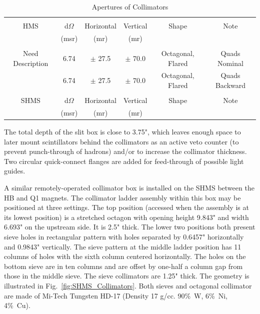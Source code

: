 {\begin{table}
\begin{center}
\caption{Apertures of Collimators\label{tab:apertures}}
\vspace{\baselineskip}
\begin{tabular}{|c|c|c|c|c|c|}
\hline
{} & {} & {} & {} & {} & {} \\
HMS				& d$\Omega$ 	& Horizontal 	& Vertical 		& Shape 			& Note \\
{} 				& (msr) 		& (mr) 		& (mr) 		& {} 				& {} \\
{} & {} & {} & {} & {} & {} \\ \hline
{}Need Description	& 6.74 		& $\pm$ 27.5 	& $\pm$ 70.0 	& Octagonal, Flared 	& Quads Nominal \\
{}	 			& 6.74 		& $\pm$ 27.5 	& $\pm$ 70.0 	& Octagonal, Flared 	& Quads Backward \\
{} & {} & {} & {} & {} & {} \\ \hline
SHMS			& d$\Omega$ 	& Horizontal 	& Vertical 		& Shape 			& Note \\
{} 				& (msr) 		& (mr) 		& (mr) 		& {} 				& {} \\
\hline
\end{tabular}
\end{center}
\end{table}

The total depth of the slit box is close to 3.75", which leaves
enough space to later mount scintillators behind the collimators as an active
veto counter (to prevent punch-through of hadrons) and/or to increase
the collimator thickness. Two circular quick-connect flanges are
added for feed-through of possible light guides.

A similar remotely-operated collimator box is installed on the SHMS between the
HB and Q1 magnets. The collimator ladder assembly within this box may be positioned
at three settings. The top position (accessed when the assembly is at its lowest
position) is a stretched octagon with opening height 9.843" and width 6.693" on the
upstream side. It is 2.5" thick. The lower two positions both present sieve holes in
rectangular pattern with holes separated by 0.6457" horizontally and 0.9843"
vertically. The sieve pattern at the middle ladder position has 11 columns of holes with
the sixth column centered horizontally. The holes on the bottom sieve are in ten
columns and are offset by one-half a column gap from those in the middle sieve.
The sieve collimators are 1.25" thick. The geometry is illustrated in Fig.~\ref{fig:SHMS_Collimators}.
Both sieves and octagonal collimator are
made of Mi-Tech\texttrademark{} Tungsten HD-17 (Density 17 g/cc. 90\%~W, 6\%~Ni, 4\%~Cu).

}

